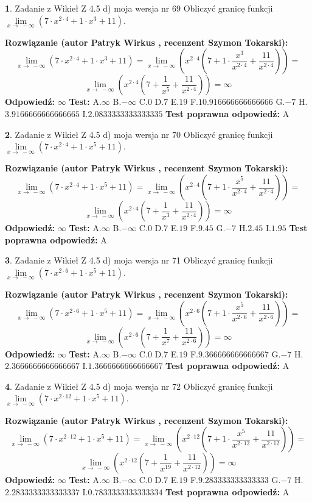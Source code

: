 \documentclass[12pt, a4paper]{article}
\theoremstyle{definition} %
\newtheorem{zad}{}
\newcommand{\zadStart}[1]{\begin{zad}#1\newline}
\newcommand{\zadStop}{\end{zad}}
\newcommand{\rozwStart}[2]{\noindent \textbf{Rozwiązanie (autor #1 , recenzent #2): }\newline}
\newcommand{\rozwStop}{\newline}
\newcommand{\odpStart}{\noindent \textbf{Odpowiedź:}\newline}
\newcommand{\odpStop}{\newline}
\newcommand{\testStart}{\noindent \textbf{Test:}\newline}
\newcommand{\testStop}{\newline}
\newcommand{\kluczStart}{\noindent \textbf{Test poprawna odpowiedź:}\newline}
\newcommand{\kluczStop}{\newline}
\begin{document}
\zadStart{Zadanie z Wikieł Z 4.5 d) moja wersja nr 69}
Obliczyć granicę funkcji  $\lim\limits_{x\to\ -\infty}(7 \cdot x^{2\cdot4}+1 \cdot x^{3}+11)$.
\zadStop
\rozwStart{Patryk Wirkus}{Szymon Tokarski}
$$\lim\limits_{x\to\ -\infty}(7 \cdot x^{2\cdot4}+1 \cdot x^{3}+11) = \lim\limits_{x\to\ -\infty}(x^{2\cdot4}(7 +1 \cdot \frac{x^{3}}{x^{2\cdot4}}+\frac{11}{x^{2\cdot4}})) =$$ $$\lim\limits_{x\to\ -\infty}(x^{2\cdot4}(7 +\frac{1}{x^{5}}+\frac{11}{x^{2\cdot4}})) =\infty$$
\rozwStop
\odpStart
$\infty$
\odpStop
\testStart
A.$\infty$ B.$-\infty$ C.$0$ D.$7$ E.$19$
F.$10.916666666666666$ G.$-7$
H.$3.9166666666666665$
I.$2.0833333333333335$
\testStop
\kluczStart
A
\kluczStop



\zadStart{Zadanie z Wikieł Z 4.5 d) moja wersja nr 70}
Obliczyć granicę funkcji  $\lim\limits_{x\to\ -\infty}(7 \cdot x^{2\cdot4}+1 \cdot x^{5}+11)$.
\zadStop
\rozwStart{Patryk Wirkus}{Szymon Tokarski}
$$\lim\limits_{x\to\ -\infty}(7 \cdot x^{2\cdot4}+1 \cdot x^{5}+11) = \lim\limits_{x\to\ -\infty}(x^{2\cdot4}(7 +1 \cdot \frac{x^{5}}{x^{2\cdot4}}+\frac{11}{x^{2\cdot4}})) =$$ $$\lim\limits_{x\to\ -\infty}(x^{2\cdot4}(7 +\frac{1}{x^{3}}+\frac{11}{x^{2\cdot4}})) =\infty$$
\rozwStop
\odpStart
$\infty$
\odpStop
\testStart
A.$\infty$ B.$-\infty$ C.$0$ D.$7$ E.$19$
F.$9.45$ G.$-7$
H.$2.45$
I.$1.95$
\testStop
\kluczStart
A
\kluczStop



\zadStart{Zadanie z Wikieł Z 4.5 d) moja wersja nr 71}
Obliczyć granicę funkcji  $\lim\limits_{x\to\ -\infty}(7 \cdot x^{2\cdot6}+1 \cdot x^{5}+11)$.
\zadStop
\rozwStart{Patryk Wirkus}{Szymon Tokarski}
$$\lim\limits_{x\to\ -\infty}(7 \cdot x^{2\cdot6}+1 \cdot x^{5}+11) = \lim\limits_{x\to\ -\infty}(x^{2\cdot6}(7 +1 \cdot \frac{x^{5}}{x^{2\cdot6}}+\frac{11}{x^{2\cdot6}})) =$$ $$\lim\limits_{x\to\ -\infty}(x^{2\cdot6}(7 +\frac{1}{x^{7}}+\frac{11}{x^{2\cdot6}})) =\infty$$
\rozwStop
\odpStart
$\infty$
\odpStop
\testStart
A.$\infty$ B.$-\infty$ C.$0$ D.$7$ E.$19$
F.$9.366666666666667$ G.$-7$
H.$2.3666666666666667$
I.$1.3666666666666667$
\testStop
\kluczStart
A
\kluczStop



\zadStart{Zadanie z Wikieł Z 4.5 d) moja wersja nr 72}
Obliczyć granicę funkcji  $\lim\limits_{x\to\ -\infty}(7 \cdot x^{2\cdot12}+1 \cdot x^{5}+11)$.
\zadStop
\rozwStart{Patryk Wirkus}{Szymon Tokarski}
$$\lim\limits_{x\to\ -\infty}(7 \cdot x^{2\cdot12}+1 \cdot x^{5}+11) = \lim\limits_{x\to\ -\infty}(x^{2\cdot12}(7 +1 \cdot \frac{x^{5}}{x^{2\cdot12}}+\frac{11}{x^{2\cdot12}})) =$$ $$\lim\limits_{x\to\ -\infty}(x^{2\cdot12}(7 +\frac{1}{x^{19}}+\frac{11}{x^{2\cdot12}})) =\infty$$
\rozwStop
\odpStart
$\infty$
\odpStop
\testStart
A.$\infty$ B.$-\infty$ C.$0$ D.$7$ E.$19$
F.$9.283333333333333$ G.$-7$
H.$2.2833333333333337$
I.$0.7833333333333334$
\testStop
\kluczStart
A
\kluczStop
\end{document}
